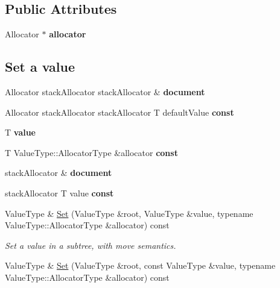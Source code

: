 \subsection*{Public Attributes}
\begin{DoxyCompactItemize}
\item 
Allocator $\ast$ {\bfseries allocator}\hypertarget{class_generic_pointer_a1c0ed90c791f04651ba958e6394da1b6}{}\label{class_generic_pointer_a1c0ed90c791f04651ba958e6394da1b6}

\end{DoxyCompactItemize}
\subsection*{Set a value}
\begin{DoxyCompactItemize}
\item 
Allocator stack\+Allocator stack\+Allocator \& {\bfseries document}\hypertarget{class_generic_pointer_ad752dac875abf36d9b990ba0cacfcbc9}{}\label{class_generic_pointer_ad752dac875abf36d9b990ba0cacfcbc9}

\item 
Allocator stack\+Allocator stack\+Allocator T default\+Value {\bfseries const}
\item 
T {\bfseries value}\hypertarget{class_generic_pointer_a08ef35da0ea9a51d8265a360f0c34540}{}\label{class_generic_pointer_a08ef35da0ea9a51d8265a360f0c34540}

\item 
T Value\+Type\+::\+Allocator\+Type \&allocator {\bfseries const}
\item 
stack\+Allocator \& {\bfseries document}\hypertarget{class_generic_pointer_afd073c4e3be53fd7ec08aec9f75fbaa9}{}\label{class_generic_pointer_afd073c4e3be53fd7ec08aec9f75fbaa9}

\item 
stack\+Allocator T value {\bfseries const}
\item 
Value\+Type \& \hyperlink{class_generic_pointer_adf0aa776e072b41d301e2a834ac2c2b5}{Set} (Value\+Type \&root, Value\+Type \&value, typename Value\+Type\+::\+Allocator\+Type \&allocator) const 
\begin{DoxyCompactList}\small\item\em Set a value in a subtree, with move semantics. \end{DoxyCompactList}\item 
Value\+Type \& \hyperlink{class_generic_pointer_a80ceefa779d8d8e4699c433eb40ef1fa}{Set} (Value\+Type \&root, const Value\+Type \&value, typename Value\+Type\+::\+Allocator\+Type \&allocator) const \hypertarget{class_generic_pointer_a80ceefa779d8d8e4699c433eb40ef1fa}{}\label{class_generic_pointer_a80ceefa779d8d8e4699c433eb40ef1fa}


\end{DoxyCompactItemize}
